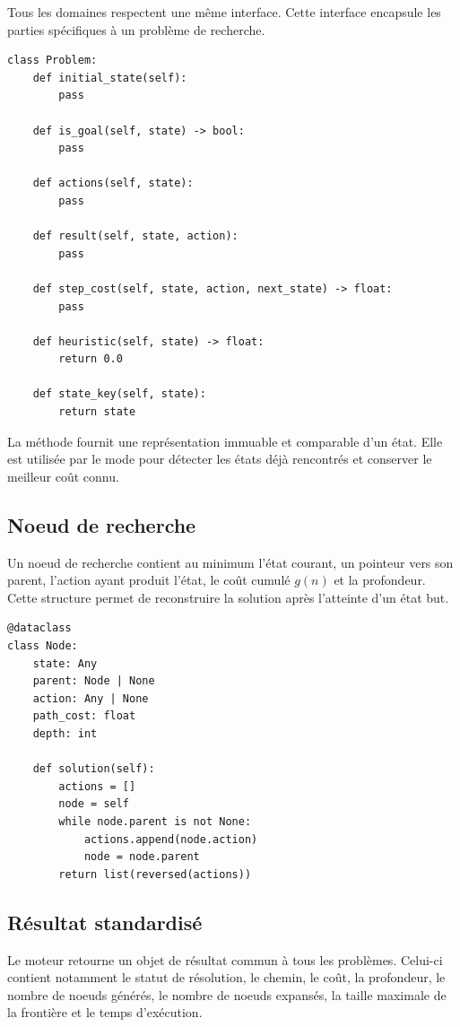 Tous les domaines respectent une même interface. Cette interface encapsule les
parties spécifiques à un problème de recherche.

\begin{lstlisting}[caption={Interface conceptuelle d'un problème.}, label={lst:problem-interface}]
class Problem:
    def initial_state(self):
        pass

    def is_goal(self, state) -> bool:
        pass

    def actions(self, state):
        pass

    def result(self, state, action):
        pass

    def step_cost(self, state, action, next_state) -> float:
        pass

    def heuristic(self, state) -> float:
        return 0.0

    def state_key(self, state):
        return state
\end{lstlisting}

La méthode  fournit une représentation immuable et comparable
d'un état. Elle est utilisée par le mode \GraphSearch{} pour détecter les
états déjà rencontrés et conserver le meilleur coût connu.

\subsection{Noeud de recherche}

Un noeud de recherche contient au minimum l'état courant, un pointeur vers son
parent, l'action ayant produit l'état, le coût cumulé $g(n)$ et la profondeur.
Cette structure permet de reconstruire la solution après l'atteinte d'un état
but.

\begin{lstlisting}[caption={Structure conceptuelle d'un noeud de recherche.}]
@dataclass
class Node:
    state: Any
    parent: Node | None
    action: Any | None
    path_cost: float
    depth: int

    def solution(self):
        actions = []
        node = self
        while node.parent is not None:
            actions.append(node.action)
            node = node.parent
        return list(reversed(actions))
\end{lstlisting}

\subsection{Résultat standardisé}

Le moteur retourne un objet de résultat commun à tous les problèmes. Celui-ci
contient notamment le statut de résolution, le chemin, le coût, la profondeur,
le nombre de noeuds générés, le nombre de noeuds expansés, la taille maximale
de la frontière et le temps d'exécution.